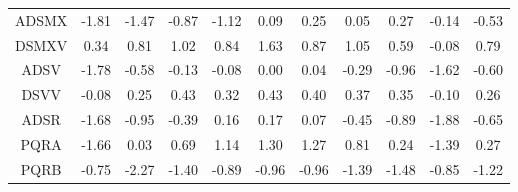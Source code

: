 \begin{longtable}{ | c || c | c | c | c | c | c | c | c | c || c |}
ADSMX &  \cellcolor[HTML]{FFCFCF} -1.81 &  \cellcolor[HTML]{FFD7D7} -1.47 &  \cellcolor[HTML]{FFE7E7} -0.87 &  \cellcolor[HTML]{FFDFDF} -1.12 &  \cellcolor[HTML]{FFFFFF} 0.09 &  \cellcolor[HTML]{F7F7FF} 0.25 &  \cellcolor[HTML]{FFFFFF} 0.05 &  \cellcolor[HTML]{F7F7FF} 0.27 &  \cellcolor[HTML]{FFFFFF} -0.14 &  \cellcolor[HTML]{FFEFEF} -0.53 \\
DSMXV &  \cellcolor[HTML]{F7F7FF} 0.34 &  \cellcolor[HTML]{E7E7FF} 0.81 &  \cellcolor[HTML]{E7E7FF} 1.02 &  \cellcolor[HTML]{E7E7FF} 0.84 &  \cellcolor[HTML]{D7D7FF} 1.63 &  \cellcolor[HTML]{E7E7FF} 0.87 &  \cellcolor[HTML]{E7E7FF} 1.05 &  \cellcolor[HTML]{EFEFFF} 0.59 &  \cellcolor[HTML]{FFFFFF} -0.08 &  \cellcolor[HTML]{EFEFFF} 0.79 \\
ADSV &  \cellcolor[HTML]{FFCFCF} -1.78 &  \cellcolor[HTML]{FFEFEF} -0.58 &  \cellcolor[HTML]{FFFFFF} -0.13 &  \cellcolor[HTML]{FFFFFF} -0.08 &  \cellcolor[HTML]{FFFFFF} 0.00 &  \cellcolor[HTML]{FFFFFF} 0.04 &  \cellcolor[HTML]{FFF7F7} -0.29 &  \cellcolor[HTML]{FFE7E7} -0.96 &  \cellcolor[HTML]{FFD7D7} -1.62 &  \cellcolor[HTML]{FFEFEF} -0.60 \\
DSVV &  \cellcolor[HTML]{FFFFFF} -0.08 &  \cellcolor[HTML]{F7F7FF} 0.25 &  \cellcolor[HTML]{F7F7FF} 0.43 &  \cellcolor[HTML]{F7F7FF} 0.32 &  \cellcolor[HTML]{F7F7FF} 0.43 &  \cellcolor[HTML]{F7F7FF} 0.40 &  \cellcolor[HTML]{F7F7FF} 0.37 &  \cellcolor[HTML]{F7F7FF} 0.35 &  \cellcolor[HTML]{FFFFFF} -0.10 &  \cellcolor[HTML]{F7F7FF} 0.26 \\
ADSR &  \cellcolor[HTML]{FFD7D7} -1.68 &  \cellcolor[HTML]{FFE7E7} -0.95 &  \cellcolor[HTML]{FFF7F7} -0.39 &  \cellcolor[HTML]{FFFFFF} 0.16 &  \cellcolor[HTML]{F7F7FF} 0.17 &  \cellcolor[HTML]{FFFFFF} 0.07 &  \cellcolor[HTML]{FFF7F7} -0.45 &  \cellcolor[HTML]{FFE7E7} -0.89 &  \cellcolor[HTML]{FFCFCF} -1.88 &  \cellcolor[HTML]{FFEFEF} -0.65 \\
PQRA &  \cellcolor[HTML]{FFD7D7} -1.66 &  \cellcolor[HTML]{FFFFFF} 0.03 &  \cellcolor[HTML]{EFEFFF} 0.69 &  \cellcolor[HTML]{DFDFFF} 1.14 &  \cellcolor[HTML]{DFDFFF} 1.30 &  \cellcolor[HTML]{DFDFFF} 1.27 &  \cellcolor[HTML]{E7E7FF} 0.81 &  \cellcolor[HTML]{F7F7FF} 0.24 &  \cellcolor[HTML]{FFDFDF} -1.39 &  \cellcolor[HTML]{F7F7FF} 0.27 \\
PQRB &  \cellcolor[HTML]{FFEFEF} -0.75 &  \cellcolor[HTML]{FFC7C7} -2.27 &  \cellcolor[HTML]{FFDFDF} -1.40 &  \cellcolor[HTML]{FFE7E7} -0.89 &  \cellcolor[HTML]{FFE7E7} -0.96 &  \cellcolor[HTML]{FFE7E7} -0.96 &  \cellcolor[HTML]{FFDFDF} -1.39 &  \cellcolor[HTML]{FFD7D7} -1.48 &  \cellcolor[HTML]{FFE7E7} -0.85 &  \cellcolor[HTML]{FFDFDF} -1.22 \\

\end{longtable}
